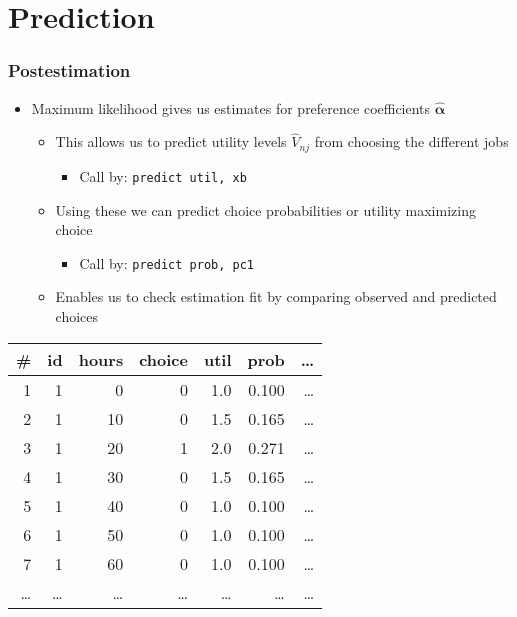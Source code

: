 \documentclass[handout,intlimits]{beamer}
\def\blue#1{\textcolor{zewblue}{#1}}
\def\vect#1{\mathbold{#1}}
\begin{document}
\section{Prediction}

\begin{frame}[fragile]
\frametitle{Postestimation}
\begin{itemize}
	\item \blue{Maximum likelihood gives us estimates for preference coefficients $\vect{\hat{\alpha}}$}
	\begin{itemize}
		\item This allows us to predict utility levels $\hat{V}_{nj}$ from choosing the different jobs
		\begin{itemize}
			\item Call by: \verb+predict util, xb+
		\end{itemize}
		\smallskip
		\item Using these we can predict choice probabilities or utility maximizing choice
		\begin{itemize}
			\item Call by: \verb+predict prob, pc1+
		\end{itemize}
		\smallskip
		\item Enables us to check estimation fit by comparing observed and predicted choices
	\end{itemize}
\end{itemize}
\begin{table}[htbp]
	\centering\tiny
	\begin{threeparttable}
	\begin{tabular}{rrrrrrr}
	\toprule
	\textbf{\#} & \textbf{id} & \textbf{hours} & \textbf{choice} & \textbf{util} & \textbf{prob} & \textbf{\dots} \\
	\midrule
	1	&	1	&	0	&	0	& 	1.0	&	0.100	& \dots \\
	2	&	1	&	10	&	0	& 	1.5	&	0.165	& \dots \\
	3	&	1	&	20	&	1	& 	2.0	&	0.271	& \dots \\
	4	&	1	&	30	&	0	& 	1.5	&	0.165	& \dots \\
	5	&	1	&	40	&	0	& 	1.0	&	0.100	& \dots \\
	6	&	1	&	50	&	0	& 	1.0	&	0.100	& \dots \\
	7	&	1	&	60	&	0	& 	1.0	&	0.100	& \dots \\
	\midrule
	\dots	&	\dots	&	\dots	&	\dots	& \dots	&	\dots 	& \dots \\
	\bottomrule
	\end{tabular}
	\end{threeparttable}
\end{table}
\end{frame}
\end{document}
